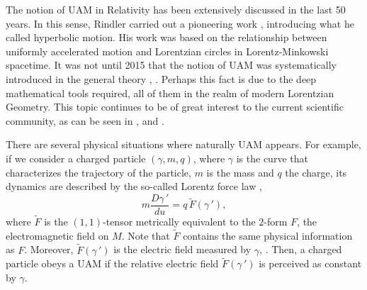 \documentclass[11pt]{book}
\begin{document}

The notion of UAM in Relativity has been extensively discussed in the last 50 years. In this sense, Rindler carried out a pioneering work \cite{LCP}, introducing what he called hyperbolic motion. His work was based on the relationship between uniformly accelerated motion and Lorentzian circles in Lorentz-Minkowski spacetime. It was not until 2015 that the notion of UAM was systematically introduced in the general theory \cite{UAM}, \cite{KGR}. Perhaps this fact is due to the deep mathematical tools required,  all of them in the realm of modern Lorentzian Geometry. This topic continues to be of great interest to the current scientific community, as can be seen in \cite{Friedman1}, \cite{Friedman2} and \cite{SolutionsUAM}.


There are several physical situations where naturally UAM appears. For example, if we consider a charged particle $(\gamma,m,q)$, where $\gamma$ is the curve that characterizes the trajectory of the particle, $m$ is the mass and $q$ the charge, its dynamics are described by the so-called Lorentz force law \cite[Definition 3.8.1]{SW},
\[
m\frac{D\gamma\,'}{du}=q\,\widetilde{F}(\gamma\,'),
\]
where $\widetilde{F}$ is the $(1,1)$-tensor metrically equivalent to the $2$-form $F$, the electromagnetic field on $M$. Note that $\widetilde{F}$ contains the same physical information as $F$. Moreover, $\widetilde{F}(\gamma\,')$ is the electric field measured by $\gamma$, \cite[Section 3.4]{SW}. Then, a charged particle obeys a UAM if the relative electric field  $\widetilde{F}(\gamma\,')$ is perceived as constant by $\gamma$.
\end{document}
